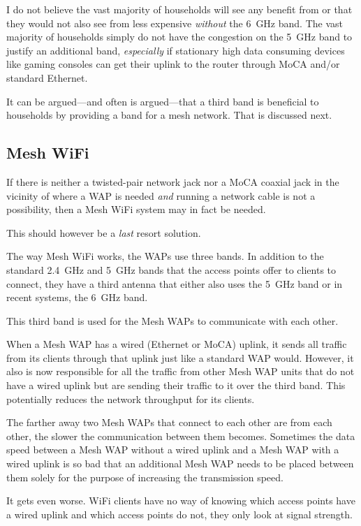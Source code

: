 I do not believe the vast majority of households will see any benefit from  or  that they
would not also see from less expensive  \emph{without} the \SI{6}{\giga\hertz} band. The vast majority
of households simply do not have the congestion on the \SI{5}{\giga\hertz} band to justify an additional band,
\emph{especially} if stationary high data consuming devices like gaming consoles can get their uplink to the
router through MoCA and/or standard Ethernet.

It can be argued---and often is argued---that a third band is beneficial to households by providing a
band for a mesh network. That is discussed next.

\subsection{Mesh WiFi}

If there is neither a twisted-pair network jack nor a MoCA coaxial jack in the vicinity of where a WAP is
needed \emph{and} running a network cable is not a possibility, then a Mesh WiFi system may in fact be
needed.

This should however be a \emph{last} resort solution.

The way Mesh WiFi works, the WAPs use three bands. In addition to the standard \SI{2.4}{\giga\hertz} and
\SI{5}{\giga\hertz} bands that the access points offer to clients to connect, they have a third antenna
that either also uses the \SI{5}{\giga\hertz} band or in recent systems, the \SI{6}{\giga\hertz} band.

This third band is used for the Mesh WAPs to communicate with each other.

When a Mesh WAP has a wired (Ethernet or MoCA) uplink, it sends all traffic from its clients through
that uplink just like a standard WAP would. However, it also is now responsible for all the traffic from
other Mesh WAP units that do not have a wired uplink but are sending their traffic to it over the third band.
This potentially reduces the network throughput for its clients.

The farther away two Mesh WAPs that connect to each other are from each other, the slower the communication
between them becomes. Sometimes the data speed between a Mesh WAP without a wired uplink and a Mesh WAP with
a wired uplink is so bad that an additional Mesh WAP needs to be placed between them solely for the purpose
of increasing the transmission speed.

It gets even worse. WiFi clients have no way of knowing which access points have a wired uplink and which
access points do not, they only look at signal strength.

